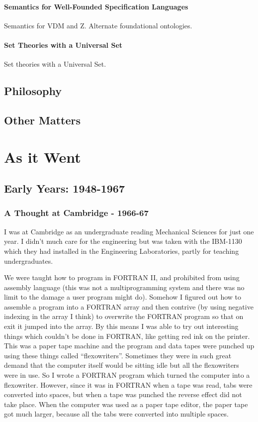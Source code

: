 \documentclass[10pt,titlepage]{book}
\begin{document}
\subsection[Well-Founded Semantics]{Semantics for Well-Founded Specification Languages}

Semantics for VDM and Z.
Alternate foundational ontologies.

\subsection{Set Theories with a Universal Set}
Set theories with a Universal Set.

\chapter{Philosophy}

\chapter{Other Matters}


\part{As it Went}

\chapter{Early Years: 1948-1967}

\section{A Thought at Cambridge - 1966-67}

I was at Cambridge as an undergraduate reading Mechanical Sciences for just one year.
I didn't much care for the engineering but was taken with the IBM-1130 which they had installed in the Engineering Laboratories, partly for teaching undergraduates.

We were taught how to program in FORTRAN II, and prohibited from using assembly language (this was not a multiprogramming system and there was no limit to the damage a user program might do).
Somehow I figured out how to assemble a program into a FORTRAN array and then contrive (by using negative indexing in the array I think) to overwrite the FORTRAN program so that on exit it jumped into the array.
By this means I was able to try out interesting things which couldn't be done in FORTRAN, like getting red ink on the printer.
This was a paper tape machine and the program and data tapes were punched up using these things called ``flexowriters''.
Sometimes they were in such great demand that the computer itself would be sitting idle but all the flexowriters were in use.
So I wrote a FORTRAN program which turned the computer into a flexowriter.
However, since it was in FORTRAN when a tape was read, tabs were converted into spaces, but when a tape was punched the reverse effect did not take place.
When the computer was used as a paper tape editor, the paper tape got much larger, because all the tabs were converted into multiple spaces.
\end{document}
